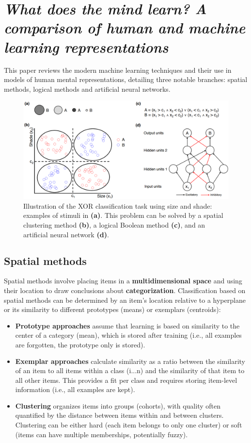 \section[Spatial methods, Logical methods and Artificial neural networks]{\textit{What does the mind learn? A comparison of human and machine learning representations}\\ }

This paper reviews the modern machine learning techniques and their use in models of human mental representations, detailing three notable branches: spatial methods, logical methods and artificial neural networks.
\begin{figure}[ht]
    \centering
    \captionsetup{width=.8\linewidth}
    \includegraphics[width=0.75\linewidth]{images/xor.png}
    \caption{Illustration of the XOR classification task using size and shade: examples of stimuli in \textbf{(a)}. This problem can be solved by a spatial clustering method \textbf{(b)}, a logical Boolean method \textbf{(c)}, and an artificial neural network \textbf{(d)}.}
\end{figure}

\subsection{Spatial methods}
Spatial methods involve placing items in a \textbf{multidimensional space} and using their location to draw conclusions about \textbf{categorization}.
Classification based on spatial methods can be determined by an item's location relative to a hyperplane or its similarity to different prototypes (means) or exemplars (centroids):
\begin{itemize}
    \item \textbf{Prototype approaches} assume that learning is based on similarity to the center of a category (mean), which is stored after training (i.e., all examples are forgotten, the prototype only is stored).
    \item \textbf{Exemplar approaches} calculate similarity as a ratio between the similarity of an item to all items within a class (i...n) and the similarity of that item to all other items. This provides a fit per class and requires storing item-level information (i.e., all examples are kept).
    \item \textbf{Clustering} organizes items into groups (cohorts), with quality often quantified by the distance between items within and between clusters. Clustering can be either hard (each item belongs to only one cluster) or soft (items can have multiple memberships, potentially fuzzy).
\end{itemize}

